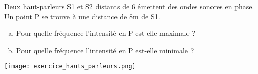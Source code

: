 %
%
    Deux haut-parleurs S1 et S2 distants de 6 émettent des ondes sonores en phase. Un point P se trouve à une distance de 8m de S1.
    \begin{enumerate}[a)]
        \item Pour quelle fréquence l'intensité en P est-elle maximale ?
        \item Pour quelle fréquence l'intensité en P est-elle minimale ?
    \end{enumerate}
    \texttt{[image: exercice\_hauts\_parleurs.png]}
